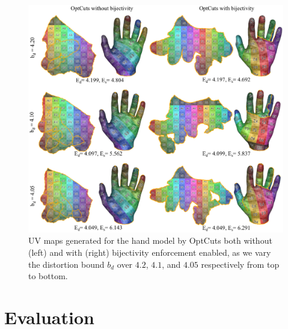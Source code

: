 \begin{figure}[t]
\centering
\includegraphics[width=\linewidth]{fig/our_impressive_results_left.png}
\vspace{-.5cm}
\caption{UV maps generated for the hand model by OptCuts both without (left) and with (right) bijectivity enforcement enabled, as we vary the distortion bound $b_d$ over $4.2$, $4.1$, and $4.05$ respectively from top to bottom.}
\vspace{-0.3cm}
\label{fig:ours_various_bounds}
\end{figure}

\section{Evaluation}
\label{sec:results}


